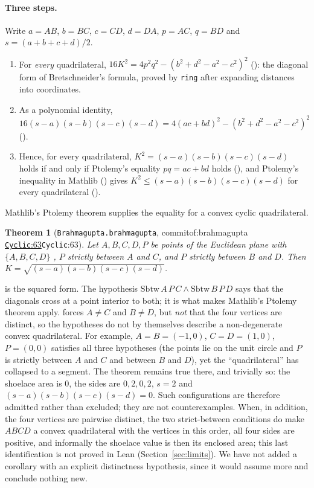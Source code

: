 \documentclass[11pt]{article}
\newtheorem{theorem}{Theorem}
\theoremstyle{definition}
\theoremstyle{remark}
\newcommand{\lean}[1]{\texttt{#1}}
\newcommand{\commitof}[1]{\csname commitof:#1\endcsname}
\newcommand{\repo}[1]{https://github.com/jpbald93/#1}
\newcommand{\src}[4]{\ifcsname commitof:#1\endcsname
  \href{\repo{#1}/blob/\commitof{#1}/#2/#3.lean\#L#4}{\texttt{#3}:#4}\else\texttt{#3}:#4\fi}
\begin{document}
\paragraph{Three steps.} Write $a=AB$, $b=BC$, $c=CD$, $d=DA$, $p=AC$, $q=BD$ and $s=(a+b+c+d)/2$.
\begin{enumerate}
\item For \emph{every} quadrilateral, $16K^2=4p^2q^2-(b^2+d^2-a^2-c^2)^2$
(): the diagonal form of Bretschneider's formula, proved by
\lean{ring} after expanding distances into coordinates.
\item As a polynomial identity,
$16(s-a)(s-b)(s-c)(s-d)=4(ac+bd)^2-(b^2+d^2-a^2-c^2)^2$ ().
\item Hence, for every quadrilateral, $K^2=(s-a)(s-b)(s-c)(s-d)$ holds if and only if Ptolemy's
equality $pq=ac+bd$ holds (), and Ptolemy's inequality
in Mathlib () gives
$K^2\le(s-a)(s-b)(s-c)(s-d)$ for every quadrilateral ().
\end{enumerate}
Mathlib's Ptolemy theorem 
supplies the equality for a convex cyclic quadrilateral.

\begin{theorem}[\texttt{Brahmagupta.brahmagupta}, \src{brahmagupta}{Brahmagupta}{Cyclic}{63}]\label{thm:brahmagupta}
Let $A,B,C,D,P$ be points of the Euclidean plane with $\{A,B,C,D\}$ , $P$
strictly between $A$ and $C$, and $P$ strictly between $B$ and $D$. Then
$K=\sqrt{(s-a)(s-b)(s-c)(s-d)}$.
\end{theorem}

 is the squared form. The hypothesis
$\mathrm{Sbtw}\,A\,P\,C\wedge\mathrm{Sbtw}\,B\,P\,D$ says that the diagonals cross at a point
interior to both; it is what makes Mathlib's Ptolemy theorem apply.  forces $A\ne C$
and $B\ne D$, but \emph{not} that the four vertices are distinct, so the hypotheses do not by
themselves describe a non-degenerate convex quadrilateral. For example, $A=B=(-1,0)$,
$C=D=(1,0)$, $P=(0,0)$ satisfies all three hypotheses (the points lie on the unit circle and $P$ is
strictly between $A$ and $C$ and between $B$ and $D$), yet the ``quadrilateral'' has collapsed to
a segment. The theorem remains true there, and trivially so: the shoelace area is $0$, the sides
are $0,2,0,2$, $s=2$ and $(s-a)(s-b)(s-c)(s-d)=0$. Such configurations are therefore admitted
rather than excluded; they are not counterexamples. When, in addition, the four vertices are
pairwise distinct, the two strict-between conditions do make $ABCD$ a convex quadrilateral with
the vertices in this order, all four sides are positive, and informally the shoelace value is
then its enclosed area; this last identification is not proved in Lean (Section~\ref{sec:limits}).
We have not added a corollary with an explicit distinctness hypothesis, since it would assume
more and conclude nothing new.
\end{document}
